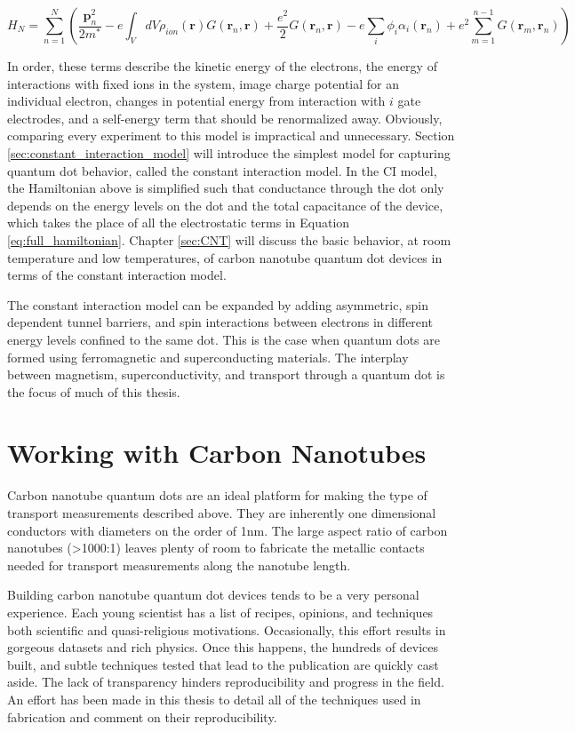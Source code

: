 \begin{equation}
\label{eq:full_hamiltonian}
    H_N = \sum_{n=1}^N \left( \frac{\mathbf{p}_n^2}{2m^*} - e \int_V dV \rho_{ion}(\mathbf{r})G(\mathbf{r}_n, \mathbf{r}) + \frac{e^2}{2} G(\mathbf{r}_n, \mathbf{r}) - e \sum_i \phi_i \alpha_i (\mathbf{r}_n) + e^2 \sum_{m=1}^{n-1} G(\mathbf{r}_m, \mathbf{r}_n) \right)
\end{equation}

In order, these terms describe the kinetic energy of the electrons, the energy of interactions with fixed ions in the system, image charge potential for an individual electron, changes in potential energy from interaction with $i$ gate electrodes, and a self-energy term that should be renormalized away. Obviously, comparing every experiment to this model is impractical and unnecessary. Section \ref{sec:constant_interaction_model} will introduce the simplest model for capturing quantum dot behavior, called the constant interaction model. In the CI model, the Hamiltonian above is simplified such that conductance through the dot only depends on the energy levels on the dot and the total capacitance of the device, which takes the place of all the electrostatic terms in Equation \ref{eq:full_hamiltonian}. Chapter \ref{sec:CNT} will discuss the basic behavior, at room temperature and low temperatures, of carbon nanotube quantum dot devices in terms of the constant interaction model.

The constant interaction model can be expanded by adding asymmetric, spin dependent tunnel barriers, and spin interactions between electrons in different energy levels confined to the same dot. This is the case when quantum dots are formed using ferromagnetic and superconducting materials. The interplay between magnetism, superconductivity, and transport through a quantum dot is the focus of much of this thesis. 

\section{Working with Carbon Nanotubes}

Carbon nanotube quantum dots are an ideal platform for making the type of transport measurements described above. They are inherently one dimensional conductors with diameters on the order of 1nm. The large aspect ratio of carbon nanotubes (>1000:1) leaves plenty of room to fabricate the metallic contacts needed for transport measurements along the nanotube length.

Building carbon nanotube quantum dot devices tends to be a very personal experience. Each young scientist has a list of recipes, opinions, and techniques both scientific and quasi-religious motivations. Occasionally, this effort results in gorgeous datasets and rich physics. Once this happens, the hundreds of devices built, and subtle techniques tested that lead to the publication are quickly cast aside. The lack of transparency hinders reproducibility and progress in the field. An effort has been made in this thesis to detail all of the techniques used in fabrication and comment on their reproducibility.


